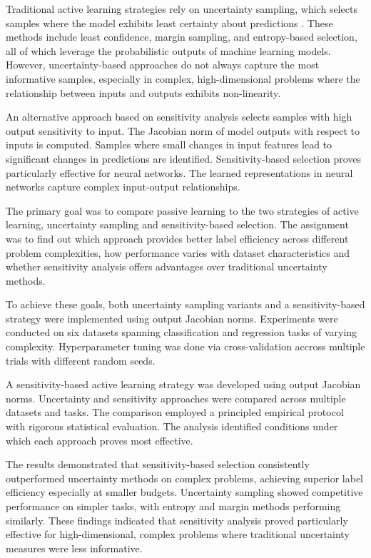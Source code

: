 \documentclass[conference]{IEEEtran}
\begin{document}
Traditional active learning strategies rely on uncertainty sampling, which selects samples where the model exhibits least certainty about predictions \cite{settles2009active}. These methods include least confidence, margin sampling, and entropy-based selection, all of which leverage the probabilistic outputs of machine learning models. However, uncertainty-based approaches do not always capture the most informative samples, especially in complex, high-dimensional problems where the relationship between inputs and outputs exhibits non-linearity.

An alternative approach based on sensitivity analysis selects samples with high output sensitivity to input. The Jacobian norm of model outputs with respect to inputs is computed. Samples where small changes in input features lead to significant changes in predictions are identified. Sensitivity-based selection proves particularly effective for neural networks. The learned representations in neural networks capture complex input-output relationships.

The primary goal was to compare passive learning to the two strategies of active learning, uncertainty sampling and sensitivity-based selection. The assignment was to find out which approach provides better label efficiency across different problem complexities, how performance varies with dataset characteristics and whether sensitivity analysis offers advantages over traditional uncertainty methods.

To achieve these goals, both uncertainty sampling variants and a sensitivity-based strategy were implemented using output Jacobian norms. Experiments were conducted on six datasets spanning classification and regression tasks of varying complexity. Hyperparameter tuning was done via cross-validation accross multiple trials with different random seeds.

A sensitivity-based active learning strategy was developed using output Jacobian norms. Uncertainty and sensitivity approaches were compared across multiple datasets and tasks. The comparison employed a principled empirical protocol with rigorous statistical evaluation. The analysis identified conditions under which each approach proves most effective.

The results demonstrated that sensitivity-based selection consistently outperformed uncertainty methods on complex problems, achieving superior label efficiency especially at smaller budgets. Uncertainty sampling showed competitive performance on simpler tasks, with entropy and margin methods performing similarly. These findings indicated that sensitivity analysis proved particularly effective for high-dimensional, complex problems where traditional uncertainty measures were less informative.
\end{document}
